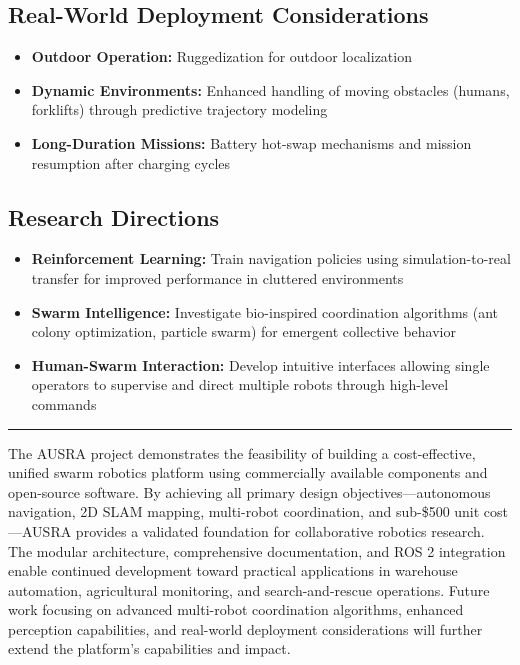 \subsection{Real-World Deployment Considerations}
\begin{itemize}
    \item \textbf{Outdoor Operation:} Ruggedization for outdoor localization
    \item \textbf{Dynamic Environments:} Enhanced handling of moving obstacles (humans, forklifts) through predictive trajectory modeling
    \item \textbf{Long-Duration Missions:} Battery hot-swap mechanisms and mission resumption after charging cycles
\end{itemize}

\subsection{Research Directions}
\begin{itemize}
    \item \textbf{Reinforcement Learning:} Train navigation policies using simulation-to-real transfer for improved performance in cluttered environments
    \item \textbf{Swarm Intelligence:} Investigate bio-inspired coordination algorithms (ant colony optimization, particle swarm) for emergent collective behavior
    \item \textbf{Human-Swarm Interaction:} Develop intuitive interfaces allowing single operators to supervise and direct multiple robots through high-level commands
\end{itemize}
\newpage
\vspace{1cm}
\hrule
\vspace{0.5cm}

The AUSRA project demonstrates the feasibility of building a cost-effective, unified swarm robotics platform using commercially available components and open-source software. By achieving all primary design objectives---autonomous navigation, 2D SLAM mapping, multi-robot coordination, and sub-\$500 unit cost---AUSRA provides a validated foundation for collaborative robotics research. The modular architecture, comprehensive documentation, and ROS 2 integration enable continued development toward practical applications in warehouse automation, agricultural monitoring, and search-and-rescue operations. Future work focusing on advanced multi-robot coordination algorithms, enhanced perception capabilities, and real-world deployment considerations will further extend the platform's capabilities and impact.

